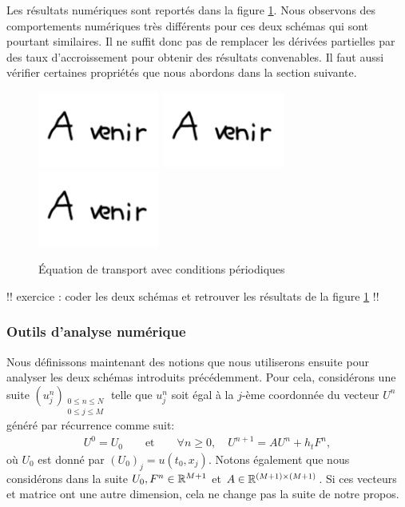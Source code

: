 \documentclass[12pt,a4paper,twoside]{article}
\begin{document}
Les r\'esultats num\'eriques sont report\'es dans la
figure \ref{fig:trans_per}.
Nous observons des comportements num\'eriques tr\`es diff\'erents pour ces deux
sch\'emas qui sont pourtant similaires.
Il ne suffit donc pas de remplacer les d\'eriv\'ees partielles
par des taux d'accroissement pour obtenir des r\'esultats convenables.
Il faut aussi v\'erifier certaines propri\'et\'es que nous abordons dans
la section suivante.

\begin{figure}[h]
  \centering
  \includegraphics[width = 4cm]{Figures/A_venir.png}
  \includegraphics[width = 4cm]{Figures/A_venir.png}
  \includegraphics[width = 4cm]{Figures/A_venir.png}
  \caption{\'Equation de transport avec conditions p\'eriodiques}
  \label{fig:trans_per}
\end{figure}

!! exercice : coder les deux sch\'emas et retrouver les r\'esultats
de la figure \ref{fig:trans_per} !!

\subsubsection{Outils d'analyse num\'erique}

Nous d\'efinissons maintenant des notions que nous
utiliserons ensuite pour analyser les deux sch\'emas introduits pr\'ec\'edemment.
Pour cela, consid\'erons une suite $(u_j^n)_{\substack{0 \leq n \leq N \\ 0 \leq j \leq M}}$
telle que $u_j^n$ soit \'egal \`a la $j$-\`eme coordonn\'ee du vecteur
$U^n$ g\'en\'er\'e par r\'ecurrence comme suit:
\begin{align}
  \label{eq:schema_1pas}
  U^0 = U_0 \qquad \text{et} \qquad \forall n \geq 0, \quad U^{n+1} = A U^n + h_t F^n ,
\end{align}
o\`u $U_0$ est donn\'e par $(U_0)_j = u(t_0,x_j)$.
Notons \'egalement que nous consid\'erons dans la suite
$U_0, F^n \in \mathbb{R}^{M+1}$ et $A \in \mathbb{R}^{(M+1)\times(M+1)}$.
Si ces vecteurs et matrice ont une autre dimension, cela ne change pas la suite de
notre propos.
\end{document}
